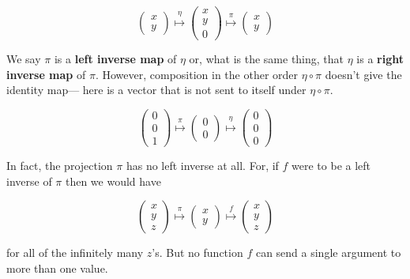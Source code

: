 $$
\begin{pmatrix} x \\ y \end{pmatrix}
\stackrel{\eta}{\longmapsto}
\begin{pmatrix} x \\ y \\ 0 \end{pmatrix}
\stackrel{\pi}{\longmapsto}
\begin{pmatrix} x \\ y \end{pmatrix}
$$



We say $\pi$ is a \textbf{left inverse map} of $\eta$ or, what is the same thing, that
$\eta$ is a \textbf{right inverse map} of $\pi$. However, composition in the other order
$\eta\circ \pi$ doesn't give the identity map--- here is a vector that is not sent to
itself under $\eta\circ \pi$.


$$
\begin{pmatrix} 0 \\ 0 \\ 1 \end{pmatrix}
\stackrel{\pi}{\longmapsto}
\begin{pmatrix} 0 \\ 0 \end{pmatrix}
\stackrel{\eta}{\longmapsto}
\begin{pmatrix} 0 \\ 0 \\ 0 \end{pmatrix}
$$

In fact, the projection $\pi$ has no left inverse at all. For, if $f$ were to be a left
inverse of $\pi$ then we would have

$$
\begin{pmatrix} x \\ y \\ z \end{pmatrix}
\stackrel{\pi}{\longmapsto}
\begin{pmatrix} x \\ y \end{pmatrix}
\stackrel{f}{\longmapsto}
\begin{pmatrix} x \\ y \\ z \end{pmatrix}
$$

for all of the infinitely many $z$'s. But no function $f$ can send a single argument to
more than one value.

